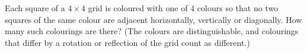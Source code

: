Each square of a $4\times4$ grid is coloured with one of $4$ colours so that no two squares of the same colour are adjacent horizontally, vertically or diagonally. How many such colourings are there? (The colours are distinguishable, and colourings that differ by a rotation or reflection of the grid count as different.)
